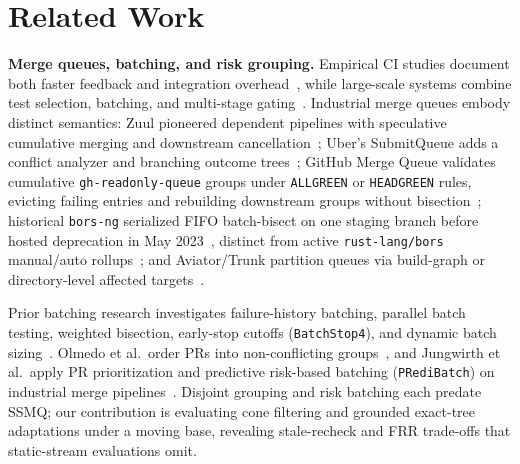 \section{Related Work}
\label{sec:related}
\textbf{Merge queues, batching, and risk grouping.} Empirical CI studies document both faster feedback and integration overhead~\cite{hilton2016usage,zhao2017impact,bernardo2023impact,wessel2023github}, while large-scale systems combine test selection, batching, and multi-stage gating~\cite{elbaum2014techniques,memon2017taming,juloori2025scale}. Industrial merge queues embody distinct semantics: Zuul pioneered dependent pipelines with speculative cumulative merging and downstream cancellation~\cite{zuul2026gating}; Uber's SubmitQueue adds a conflict analyzer and branching outcome trees~\cite{ananthanarayanan2019keeping}; GitHub Merge Queue validates cumulative \texttt{gh-readonly-queue} groups under \texttt{ALLGREEN} or \texttt{HEADGREEN} rules, evicting failing entries and rebuilding downstream groups without bisection~\cite{github2026mergequeue}; historical \texttt{bors-ng} serialized FIFO batch-bisect on one staging branch before hosted deprecation in May 2023~\cite{borsng2023}, distinct from active \texttt{rust-lang/bors} manual/auto rollups~\cite{rustbors2026}; and Aviator/Trunk partition queues via build-graph or directory-level affected targets~\cite{aviator2026targets}.

Prior batching research investigates failure-history batching, parallel batch testing, weighted bisection, early-stop cutoffs (\texttt{BatchStop4}), and dynamic batch sizing~\cite{najafi2019bisecting,bavand2021mining,beheshtian2022software,fallahzadeh2023accelerating,kamath2025lightweight,fallahzadeh2025contrasting}. Olmedo et al.\ order PRs into non-conflicting groups~\cite{olmedo2022improving}, and Jungwirth et al.\ apply PR prioritization and predictive risk-based batching (\texttt{PRediBatch}) on industrial merge pipelines~\cite{jungwirth2025improving,jungwirth2026predictive}. Disjoint grouping and risk batching each predate SSMQ; our contribution is evaluating cone filtering and grounded exact-tree adaptations under a moving base, revealing stale-recheck and FRR trade-offs that static-stream evaluations omit.


